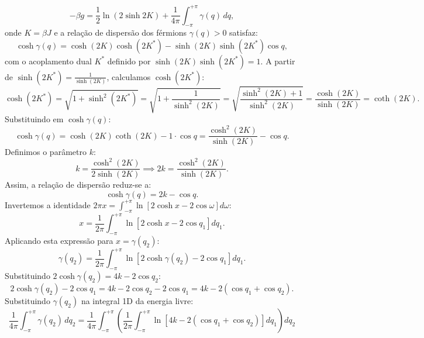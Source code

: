 \documentclass[11pt,a4paper]{article}
\begin{document}
%
\begin{equation}
    -\beta g = \frac{1}{2}\ln(2\sinh 2K) + \frac{1}{4\pi} \int_{-\pi}^{+\pi} \gamma(q) \, dq,
\end{equation}
%
onde $K = \beta J$ e a relação de dispersão dos férmions $\gamma(q) > 0$ satisfaz:
%
\begin{equation}
    \cosh \gamma(q) = \cosh(2K)\cosh(2K^*) - \sinh(2K)\sinh(2K^*)\cos q,
\end{equation}
%
com o acoplamento dual $K^*$ definido por $\sinh(2K)\sinh(2K^*) = 1$. A partir de $\sinh(2K^*) = \frac{1}{\sinh(2K)}$, calculamos $\cosh(2K^*)$:
%
\begin{equation}
    \cosh(2K^*) = \sqrt{1 + \sinh^2(2K^*)} 
    = \sqrt{1 + \frac{1}{\sinh^2(2K)}} 
    = \sqrt{\frac{\sinh^2(2K) + 1}{\sinh^2(2K)}} 
    = \frac{\cosh(2K)}{\sinh(2K)} 
    = \coth(2K).
\end{equation}
%
Substituindo em $\cosh \gamma(q)$:
%
\begin{equation}
    \cosh \gamma(q) = \cosh(2K)\coth(2K) - 1 \cdot \cos q 
    = \frac{\cosh^2(2K)}{\sinh(2K)} - \cos q.
\end{equation}
%
Definimos o parâmetro $k$:
%
\begin{equation}
    k = \frac{\cosh^2(2K)}{2\sinh(2K)} \implies 2k = \frac{\cosh^2(2K)}{\sinh(2K)}.
\end{equation}
%
Assim, a relação de dispersão reduz-se a:
%
\begin{equation}
    \cosh \gamma(q) = 2k - \cos q.
\end{equation}
%
Invertemos a identidade $2\pi x = \int_{-\pi}^{+\pi} \ln\left[2\cosh x - 2\cos\omega\right] d\omega$:
%
\begin{equation}
    x = \frac{1}{2\pi} \int_{-\pi}^{+\pi} \ln\left[2\cosh x - 2\cos q_1\right] dq_1.
\end{equation}
%
Aplicando esta expressão para $x = \gamma(q_2)$:
%
\begin{equation}
    \gamma(q_2) = \frac{1}{2\pi} \int_{-\pi}^{+\pi} \ln\left[2\cosh \gamma(q_2) - 2\cos q_1\right] dq_1.
\end{equation}
%
Substituindo $2\cosh\gamma(q_2) = 4k - 2\cos q_2$:
%
\begin{equation}
    2\cosh \gamma(q_2) - 2\cos q_1 = 4k - 2\cos q_2 - 2\cos q_1 = 4k - 2(\cos q_1 + \cos q_2).
\end{equation}
%
Substituindo $\gamma(q_2)$ na integral 1D da energia livre:
%
\begin{equation}
    \frac{1}{4\pi} \int_{-\pi}^{+\pi} \gamma(q_2) \, dq_2 
    = \frac{1}{4\pi} \int_{-\pi}^{+\pi} \left( \frac{1}{2\pi} \int_{-\pi}^{+\pi} \ln\left[4k - 2(\cos q_1 + \cos q_2)\right] dq_1 \right) dq_2
\end{equation}
\end{document}
